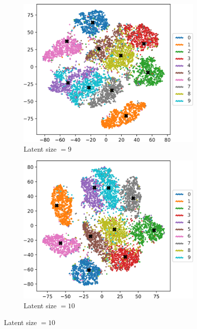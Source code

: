 \begin{figure}[]
     \par\bigskip
     \begin{subfigure}[b]{0.47\textwidth}
         \centering
         \includegraphics[width=\textwidth]{observational/img/vae/vae_TSNE_ls9.png}
         \caption{Latent size $=9$}
     \end{subfigure}
     \hfill
     \begin{subfigure}[b]{0.47\textwidth}
         \centering
         \includegraphics[width=\textwidth]{observational/img/vae/vae_TSNE_default.png}
         \caption{Latent size $=10$}
     \end{subfigure} 

\end{figure}
